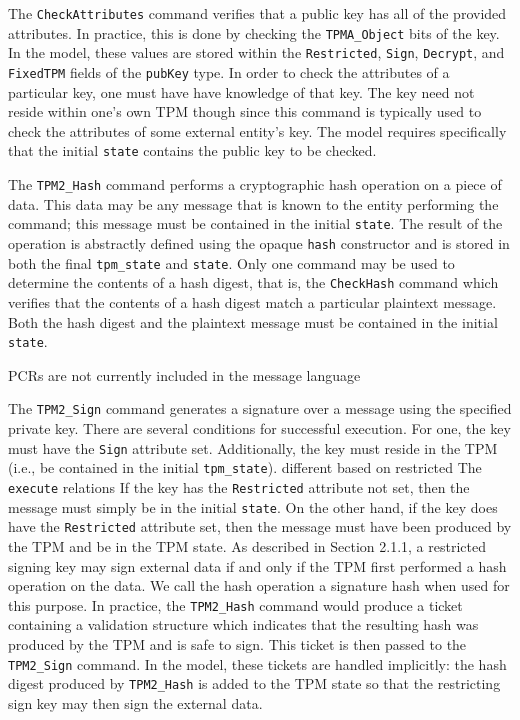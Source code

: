 The \verb|CheckAttributes| command verifies that a public key has all of the provided attributes. In practice, this is done by checking the \verb|TPMA_Object|  bits of the key. In the model, these values are stored within the \verb|Restricted|, \verb|Sign|, \verb|Decrypt|, and \verb|FixedTPM| fields of the \verb|pubKey| type. In order to check the attributes of a particular key, one must have have knowledge of that key. The key need not reside within one's own TPM though since this command is typically used to check the attributes of some external entity's key. The model requires specifically that the initial \verb|state| contains the public key to be checked.


The \verb|TPM2_Hash| command performs a cryptographic hash operation on a piece of data. This data may be any message that is known to the entity performing the command; this message must be contained in the initial \verb|state|. The result of the operation is abstractly defined using the opaque \verb|hash| constructor and is stored in both the final \verb|tpm_state| and \verb|state|. Only one command may be used to determine the contents of a hash digest, that is, the \verb|CheckHash| command which verifies that the contents of a hash digest match a particular plaintext message. Both the hash digest and the plaintext message must be contained in the initial \verb|state|.

PCRs are not currently included in the message language

The \verb|TPM2_Sign| command generates a signature over a message using the specified private key. There are several conditions for successful execution. For one, the key must have the \verb|Sign| attribute set. Additionally, the key must reside in the TPM (i.e., be contained in the initial \verb|tpm_state|). different based on restricted The \verb|execute| relations If the key has the \verb|Restricted| attribute not set, then the message must simply be in the initial \verb|state|. On the other hand, if the key does have the \verb|Restricted| attribute set, then the message must have been produced by the TPM and be in the TPM state. As described in Section 2.1.1, a restricted signing key may sign external data if and only if the TPM first performed a hash operation on the data. We call the hash operation a signature hash when used for this purpose. In practice, the \verb|TPM2_Hash| command would produce a ticket containing a validation structure which indicates that the resulting hash was produced by the TPM and is safe to sign. This ticket is then passed to the \verb|TPM2_Sign| command. In the model, these tickets are handled implicitly: the hash digest produced by \verb|TPM2_Hash| is added to the TPM state so that the restricting sign key may then sign the external data. 

